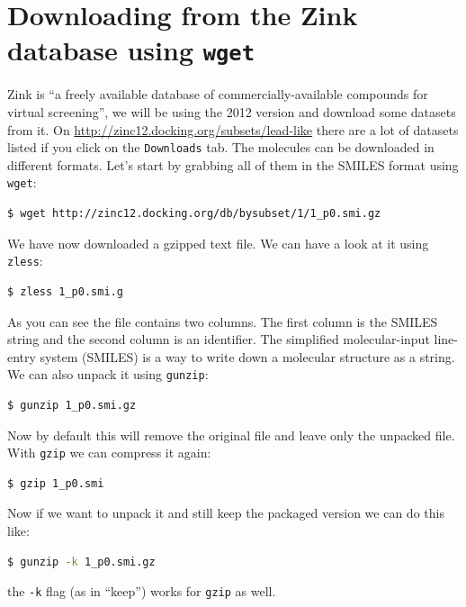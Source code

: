 \documentclass[watermark]{pbpreprint}
\begin{document}
\section{Downloading from the Zink database using \texttt{wget}}
Zink is ``a freely available database of commercially-available compounds for
virtual screening'', we will be using the 2012 version and download some
datasets from it. On \url{http://zinc12.docking.org/subsets/lead-like} there
are a lot of datasets listed if you click on the \texttt{Downloads} tab. The
molecules can be downloaded in different formats. Let's start by grabbing all
of them in the SMILES format using \texttt{wget}:
\begin{lstlisting}[language=bash]
$ wget http://zinc12.docking.org/db/bysubset/1/1_p0.smi.gz
\end{lstlisting}
We have now downloaded a gzipped text file. We can have a look at it using
\texttt{zless}:
\begin{lstlisting}[language=bash]
$ zless 1_p0.smi.g
\end{lstlisting}
As you can see the file contains two columns. The first column is the SMILES
string and the second column is an identifier. The simplified molecular-input
line-entry system (SMILES) is a way to write down a molecular structure as a
string. We can also unpack it using \texttt{gunzip}:%
%
\begin{lstlisting}[language=bash]
$ gunzip 1_p0.smi.gz
\end{lstlisting}
Now by default this will remove the original file and leave only the unpacked
file. With \texttt{gzip} we can compress it again:
\begin{lstlisting}[language=bash]
$ gzip 1_p0.smi
\end{lstlisting}
Now if we want to unpack it and still keep the packaged version we can do this like:
\begin{lstlisting}[language=bash]
$ gunzip -k 1_p0.smi.gz
\end{lstlisting}
the \texttt{-k} flag (as in ``keep'') works for \texttt{gzip} as well. 
\end{document}
